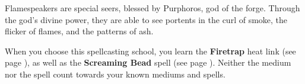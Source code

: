     Flamespeakers are special seers, blessed by Purphoros, god of the forge.
    Through the god's divine power, they are able to see portents in the curl of smoke, the flicker of flames, and the patterns of ash.

    When you choose this spellcasting school, you learn the \textbf{Firetrap} heat link (see page \pageref{medium::firetrap}), as well as the \textbf{Screaming Bead} spell (see page \pageref{spell::screamingbead}).
    Neither the medium nor the spell count towards your known mediums and spells.

\pagebreak

